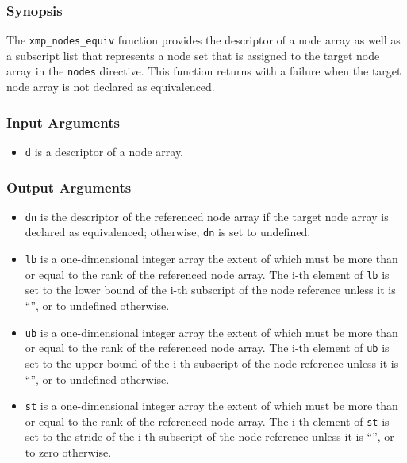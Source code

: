 \subsubsection*{Synopsis}

The {\tt xmp\_nodes\_equiv} function provides the descriptor of a node
array as well as a subscript list that represents a node set that is 
assigned to the target node array in the {\tt nodes} directive. This
function returns with a failure when the target node array is not declared
as equivalenced.

\subsubsection*{Input Arguments}
\begin{itemize}
 \item {\tt d} is a descriptor of a node array.
\end{itemize}

\subsubsection*{Output Arguments}
\begin{itemize}
 \item {\tt dn} is the descriptor of the referenced node array
       if the target node array is declared as equivalenced; otherwise,
       {\tt dn} is set to undefined.
 \item {\tt lb} is a one-dimensional integer array the extent of which
       must be more than or equal to the rank of the referenced node
       array. The i-th element of {\tt lb} is set to the lower bound of
       the i-th subscript of the node reference unless it is ``{\tt *}'',
       or to undefined otherwise.
 \item {\tt ub} is a one-dimensional integer array the extent of which
       must be more than or equal to the rank of the referenced node
       array. The i-th element of {\tt ub} is set to the upper bound of
       the i-th subscript of the node reference unless it is ``{\tt *}'',
       or to undefined otherwise.
 \item {\tt st} is a one-dimensional integer array the extent of which
       must be more than or equal to the rank of the referenced node
       array. The i-th element of {\tt st} is set to the stride of
       the i-th subscript of the node reference unless it is ``{\tt *}'',
       or to zero otherwise.
\end{itemize}


